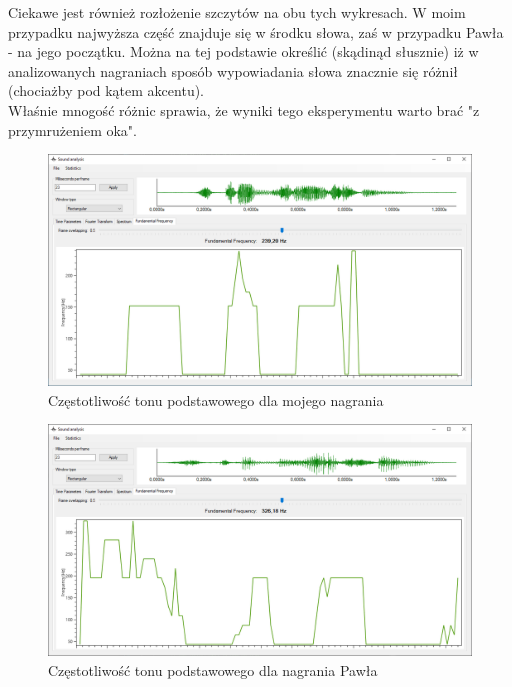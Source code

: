 \documentclass[a4paper]{article}
\begin{document}
Ciekawe jest również rozłożenie szczytów na obu tych wykresach. W moim przypadku najwyższa część znajduje się w środku słowa, zaś w przypadku Pawła - na jego początku. Można na tej podstawie określić (skądinąd słusznie) iż w analizowanych nagraniach sposób wypowiadania słowa znacznie się różnił (chociażby pod kątem akcentu).\\Właśnie mnogość różnic sprawia, że wyniki tego eksperymentu warto brać "z przymrużeniem oka".
\begin{figure}[H]
  \centering
  \includegraphics[width=0.86\linewidth]{images/14frequencyMy.png}
  \caption{Częstotliwość tonu podstawowego dla mojego nagrania}
\end{figure}
\begin{figure}[H]
  \centering
  \includegraphics[width=0.86\linewidth]{images/15frequencyBro.png}
  \caption{Częstotliwość tonu podstawowego dla nagrania Pawła}
\end{figure}
\end{document}
